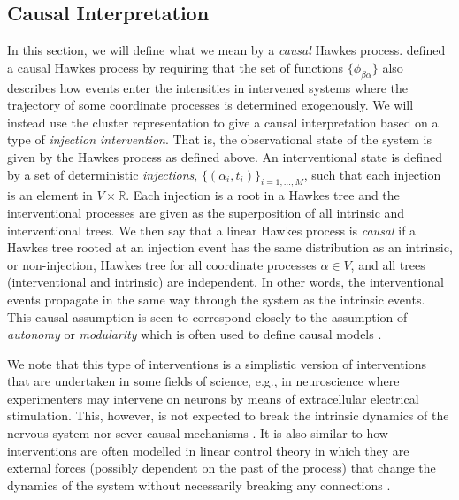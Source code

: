 \documentclass[accepted]{uai2021} %
\begin{document}

\subsection{Causal Interpretation}

In this section, we will define what we mean by a {\it causal} Hawkes process. 
\cite{mogensenUAI2020} defined a causal Hawkes process by requiring that the 
set 
of functions $\{\phi_{\beta\alpha}\}$ also describes how events enter the 
intensities in intervened systems where the trajectory of some 
coordinate processes is determined exogenously. We will instead use the cluster 
representation to give a causal
interpretation based on a type of \emph{injection intervention}. That is, the 
observational state of the system is given by the Hawkes process as defined 
above. An interventional state is defined by a set of deterministic 
\emph{injections}, 
$\{(\alpha_i, t_i) \}_{i =1,\ldots, M} $, such that each injection is an 
element in $V\times \mathbb{R}$. Each injection is 
a root in a Hawkes tree and the interventional processes are given as the 
superposition of all intrinsic and interventional trees. We then say that a 
linear Hawkes process is {\it 
causal} if a Hawkes tree rooted at an injection event has the same distribution 
as an 
intrinsic, or non-injection, Hawkes tree for all coordinate processes $\alpha 
\in V$, and all trees (interventional and intrinsic) are independent. In 
other words, the interventional events 
propagate in the same way through the system as the intrinsic events. This 
causal assumption is seen to correspond closely to 
the assumption of \emph{autonomy} or \emph{modularity} which is often used to 
define causal models 
\citep{pearl2009, petersElements2017}.

We note that this type of interventions is a simplistic version of 
interventions that are undertaken in some fields of 
science, e.g., in neuroscience where experimenters may intervene on neurons by 
means of extracellular electrical stimulation. This, however, is not expected 
to break the intrinsic dynamics of the nervous system nor 
sever causal mechanisms \citep{meffin2012, komarov2019}. It is also similar to 
how interventions are 
often 
modelled in linear control theory in which they are external forces (possibly 
dependent on the past of the process) that change the dynamics of the system 
without necessarily breaking any connections \citep{aastrom2008, zabczyk2020}.
\end{document}
